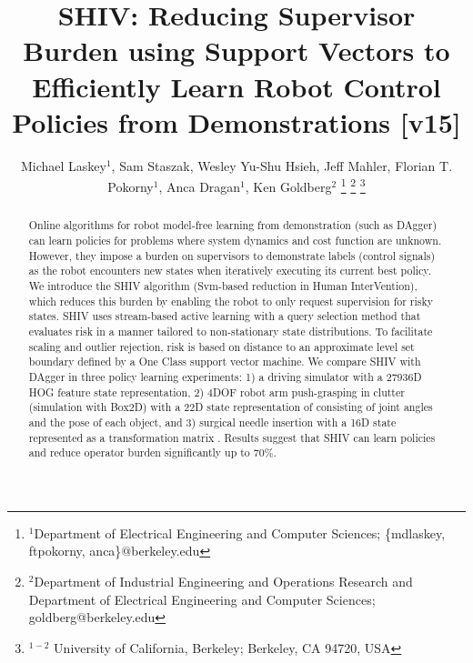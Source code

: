 \documentclass[10pt, conference]{ieeeconf}      %
\title{SHIV: Reducing Supervisor Burden using Support Vectors to Efficiently Learn Robot Control Policies from Demonstrations [v15]}
\author{Michael Laskey$^1$, Sam Staszak, Wesley Yu-Shu Hsieh, Jeff Mahler, Florian T. Pokorny$^1$, Anca Dragan$^1$, Ken Goldberg$^2$%
\thanks{$^1$Department of Electrical Engineering and Computer Sciences; {\small \{mdlaskey, ftpokorny, anca\}@berkeley.edu}}%
\thanks{$^2$Department of Industrial Engineering and Operations Research and Department of Electrical Engineering and Computer Sciences; {\small goldberg@berkeley.edu}}%
\thanks{$^{1-2}$ University of California, Berkeley;  Berkeley, CA 94720, USA}%
}
\begin{document}
\maketitle
\thispagestyle{empty}
\pagestyle{empty}



\begin{abstract}
Online algorithms for robot model-free learning from demonstration (such as DAgger) can learn policies for problems where system
dynamics and cost function are unknown. However, they impose a burden on supervisors to demonstrate labels (control
signals) as the robot encounters new states when iteratively executing its current best policy. We introduce the SHIV
algorithm (Svm-based reduction in Human InterVention), which reduces this burden by enabling the robot to only request supervision for risky states. SHIV uses stream-based active learning with a query selection method that evaluates risk in a manner tailored to non-stationary state distributions.  To facilitate scaling and outlier rejection, risk is based on distance to an approximate level set boundary defined by a One Class support vector machine.  We compare SHIV with DAgger in three policy learning experiments: 1) a driving simulator with a 27936D HOG feature state representation, 2) 4DOF robot arm push-grasping in clutter (simulation with Box2D) with a 22D state representation of consisting of joint angles and the pose of each object, and 3) surgical needle insertion with a 16D state represented as a transformation matrix .  Results suggest that SHIV can learn policies and reduce operator burden significantly  up to 70$\%$.





\end{abstract}
\end{document}
